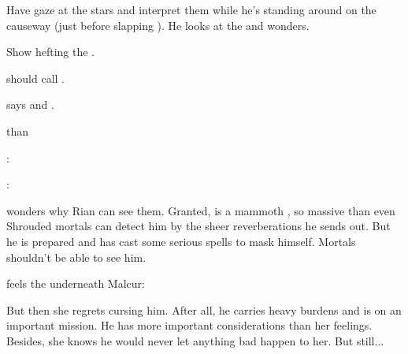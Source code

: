 \begin{garbage}
\begin{changes}
    Have \Teshrial{} gaze at the stars and interpret them while he's standing around on the causeway (just before slapping \Achsah). 
    He looks at the  and wonders. 
    
    Show \Teshrial{} hefting the \senaan{} \hs{\Turishah}. 
  
  \begin{comment}\paragraph{What Slithers Beneath}\end{comment}
    \Criseis{} should call \Ishnaruchaefir{} . 
    
    \Ishnaruchaefir{} says  and . 
    
    \Criseis{}  than 
    \begin{prose}
      \Ishnaruchaefir: 
      
      \Criseis:
    \end{prose}

    \Criseis{} wonders why Rian can see them. 
    Granted, \Ishnaruchaefir{} is a mammoth \vertex, so massive than even Shrouded mortals can detect him by the sheer reverberations he sends out. 
    But he is prepared and has cast some serious spells to mask himself. 
    Mortals shouldn't be able to see him. 
    
    \begin{prose}
    \end{prose}
    
    \Criseis{} feels the \ghobaleth{} underneath Malcur:
    \begin{prose}
    \end{prose}
      
    But then she regrets cursing him. 
    After all, he carries heavy burdens and is on an important mission. 
    He has more important considerations than her feelings. 
    Besides, she knows he would never let anything bad happen to her. 
    But still...
    

\end{changes}
\end{garbage}
